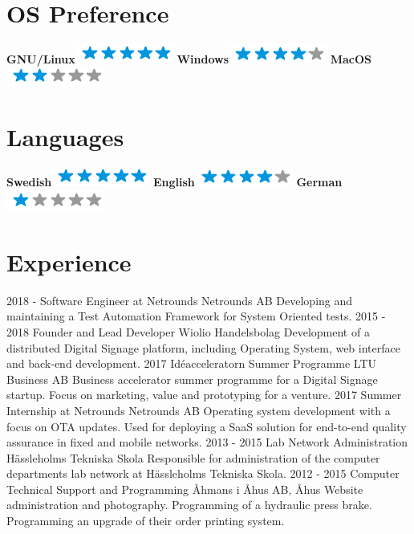 \documentclass[]{friggeri-cv}
\begin{document}
\begin{aside}
  \section{OS Preference}
    \textbf{GNU/Linux}\includegraphics[scale=0.40]{img/5stars.png}
    \textbf{Windows}\includegraphics[scale=0.40]{img/4stars.png}
    \textbf{MacOS}\includegraphics[scale=0.40]{img/2stars.png}
    ~
  \section{Languages}
    \textbf{Swedish}\includegraphics[scale=0.40]{img/5stars.png}
    \textbf{English}\includegraphics[scale=0.40]{img/4stars.png}
    \textbf{German}\includegraphics[scale=0.40]{img/1stars.png}
\end{aside}

\section{Experience}
\begin{entrylist}
    \entry
    {2018 -}
    {Software Engineer at Netrounds}
    {Netrounds AB}
    {Developing and maintaining a Test Automation Framework for System Oriented tests.}
    \entry
    {2015 - 2018}
    {Founder and Lead Developer}
    {Wiolio Handelsbolag}
    {Development of a distributed Digital Signage platform, including Operating System, web interface and back-end development.}
    \entry
    {2017}
    {Idéacceleratorn Summer Programme}
    {LTU Business AB}
    {Business accelerator summer programme for a Digital Signage startup. Focus on marketing, value and prototyping for a venture.}
    \entry
    {2017}
    {Summer Internship at Netrounds}
    {Netrounds AB}
    {Operating system development with a focus on OTA updates. Used for deploying a SaaS solution for end-to-end quality assurance in fixed and mobile networks.}
    \entry
    {2013 - 2015}
    {Lab Network Administration}
    {Hässleholms Tekniska Skola}
    {Responsible for administration of the computer departments lab network at Hässleholms Tekniska Skola.}
    \entry
    {2012 - 2015}
    {Computer Technical Support and Programming}
    {Åhmans i Åhus AB, Åhus}
    {Website administration and photography. Programming of a hydraulic press brake. Programming an upgrade of their order printing system.\\}
\end{entrylist}
\end{document}
